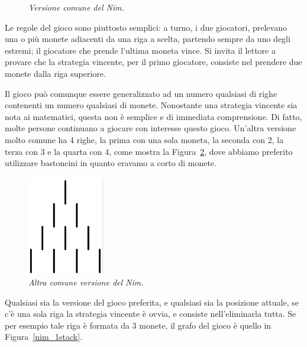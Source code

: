 \documentclass[a4paper, 10pt]{report}
\theoremstyle{definition} %
\begin{document}
\begin{figure}[h]
  \label{nim_game}
  \centerline{
  }
  \caption{\textsl{Versione comune del Nim.}}
\end{figure}

Le regole del gioco sono piuttosto semplici: a turno, i due giocatori,
pre\-levano una o pi\`u monete adiacenti da una riga a scelta, partendo sempre
da uno degli estremi; il giocatore che prende l'ultima moneta vince.
Si invita il lettore a provare che la strategia vincente, per il primo
giocatore, consiste nel prendere due monete dalla riga superiore.

Il gioco pu\`o comunque essere generalizzato ad un numero qualsiasi di righe
contenenti un numero qualsiasi di monete.
Nonostante una strategia vincente sia nota ai matematici, questa non \`e
semplice e di immediata comprensione. Di fatto, molte persone continuano a
giocare con interesse questo gioco. Un'altra versione molto comune ha 4 righe,
la prima con una sola moneta, la seconda con 2, la terza con 3 e la quarta
con 4, come mostra la Figura~\ref{nim_sticks}, dove abbiamo preferito utilizzare
bastoncini in quanto eravamo a corto di monete.

\begin{figure}[h]
  \label{nim_sticks}
  \centerline{
       \includegraphics[width=0.3\textwidth]{figs/nim_sticks.png}  
  }
  \caption{\textsl{Altra comune versione del Nim.}}
\end{figure}

Qualsiasi sia la versione del gioco preferita, e qualsiasi sia la posizione
attuale, se c'\`e una sola riga la strategia vincente \`e ovvia, e consiste
nell'eliminarla tutta. Se per esempio tale riga \`e formata da 3 monete, il
grafo del gioco \`e quello in Figura~\ref{nim_1stack}.
\end{document}
